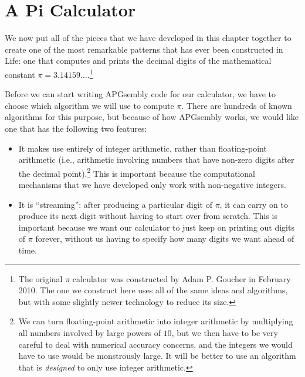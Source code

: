 \section{A Pi Calculator}\label{sec:pi_calc}

We now put all of the pieces that we have developed in this chapter together to create one of the most remarkable patterns that has ever been constructed in Life: one that computes and prints the decimal digits of the mathematical constant $\pi = 3.14159\ldots$.\footnote{The original $\pi$ calculator was constructed by Adam P. Goucher in February 2010. The one we construct here uses all of the same ideas and algorithms, but with some slightly newer technology to reduce its size.}

Before we can start writing APGsembly code for our calculator, we have to choose which algorithm we will use to compute $\pi$. There are hundreds of known algorithms for this purpose, but because of how APGsembly works, we would like one that has the following two features:\smallskip

\begin{itemize}
	\item It makes use entirely of integer arithmetic, rather than floating-point arithmetic (i.e., arithmetic involving numbers that have non-zero digits after the decimal point).\footnote{We can turn floating-point arithmetic into integer arithmetic by multiplying all numbers involved by large powers of $10$, but we then have to be very careful to deal with numerical accuracy concerns, and the integers we would have to use would be monstrously large. It will be better to use an algorithm that is \emph{designed} to only use integer arithmetic.} This is important because the computational mechanisms that we have developed only work with non-negative integers.\smallskip
	
	\item It is ``streaming'': after producing a particular digit of $\pi$, it can carry on to produce its next digit without having to start over from scratch. This is important because we want our calculator to just keep on printing out digits of $\pi$ forever, without us having to specify how many digits we want ahead of time.\smallskip
\end{itemize}

